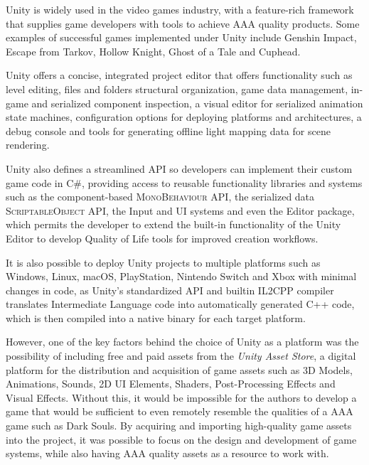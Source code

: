 
Unity is widely used in the video games industry, with a feature-rich framework that supplies game developers with tools to achieve AAA quality products. Some examples of successful games implemented under Unity include Genshin Impact, Escape from Tarkov, Hollow Knight, Ghost of a Tale and Cuphead.

Unity offers a concise, integrated project editor that offers functionality such as level editing, files and folders structural organization, game data management, in-game and serialized component inspection, a visual editor for serialized animation state machines, configuration options for deploying platforms and architectures, a debug console and tools for generating offline light mapping data for scene rendering.

Unity also defines a streamlined API so developers can implement their custom game code in \textsc{C\#}, providing access to reusable functionality libraries and systems such as the component-based \textsc{MonoBehaviour} API, the serialized data \textsc{ScriptableObject} API, the Input and UI systems and even the Editor package, which permits the developer to extend the built-in functionality of the Unity Editor to develop Quality of Life tools for improved creation workflows.

It is also possible to deploy Unity projects to multiple platforms such as Windows, Linux, macOS, PlayStation, Nintendo Switch and Xbox with minimal changes in code, as Unity's standardized API and builtin \textsc{IL2CPP} compiler translates Intermediate Language code into automatically generated \textsc{C++} code, which is then compiled into a native binary for each target platform.

However, one of the key factors behind the choice of Unity as a platform was the possibility of including free and paid assets from the \emph{Unity Asset Store}, a digital platform for the distribution and acquisition of game assets such as 3D Models, Animations, Sounds, 2D UI Elements, Shaders, Post-Processing Effects and Visual Effects. Without this, it would be impossible for the authors to develop a game that would be sufficient to even remotely resemble the qualities of a AAA game such as Dark Souls. By acquiring and importing high-quality game assets into the project, it was possible to focus on the design and development of game systems, while also having AAA quality assets as a resource to work with.

